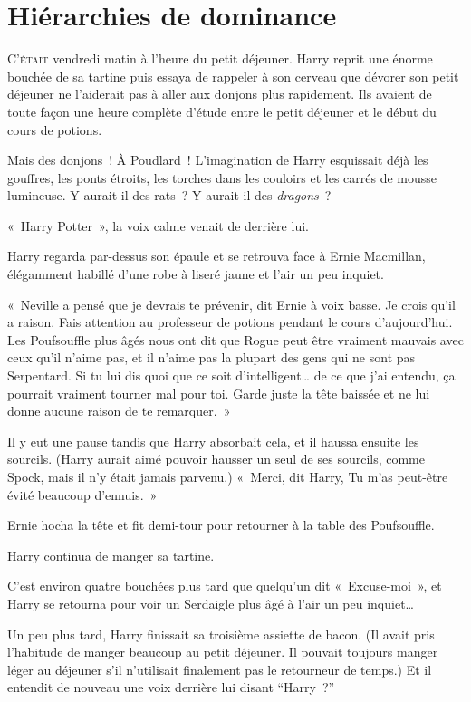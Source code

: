 
\chapter{Hiérarchies de dominance}

\lettrine{C}{'était} vendredi matin à l'heure du petit déjeuner.
Harry reprit une énorme bouchée de sa tartine puis essaya de rappeler à son cerveau que dévorer son petit déjeuner ne l'aiderait pas à aller aux donjons plus rapidement.
Ils avaient de toute façon une heure complète d'étude entre le petit déjeuner et le début du cours de potions.

Mais des donjons~!
À Poudlard~!
L'imagination de Harry esquissait déjà les gouffres, les ponts étroits, les torches dans les couloirs et les carrés de mousse lumineuse.
Y aurait-il des rats~?
Y aurait-il des \emph{dragons}~?

«~Harry Potter~», la voix calme venait de derrière lui.

Harry regarda par-dessus son épaule et se retrouva face à Ernie Macmillan, élégamment habillé d’une robe à liseré jaune et l'air un peu inquiet.

«~Neville a pensé que je devrais te prévenir, dit Ernie à voix basse.
Je crois qu'il a raison.
Fais attention au professeur de potions pendant le cours d'aujourd'hui.
Les Poufsouffle plus âgés nous ont dit que Rogue peut être vraiment mauvais avec ceux qu'il n'aime pas, et il n'aime pas la plupart des gens qui ne sont pas Serpentard.
Si tu lui dis quoi que ce soit d'intelligent… de ce que j'ai entendu, ça pourrait vraiment tourner mal pour toi.
Garde juste la tête baissée et ne lui donne aucune raison de te remarquer.~»

Il y eut une pause tandis que Harry absorbait cela, et il haussa ensuite les sourcils. (Harry aurait aimé pouvoir hausser un seul de ses sourcils, comme Spock, mais il n'y était jamais parvenu.)
«~Merci, dit Harry, Tu m'as peut-être évité beaucoup d'ennuis.~»

Ernie hocha la tête et fit demi-tour pour retourner à la table des Poufsouffle.

Harry continua de manger sa tartine.

C'est environ quatre bouchées plus tard que quelqu'un dit «~Excuse-moi~», et Harry se retourna pour voir un Serdaigle plus âgé à l'air un peu inquiet…

Un peu plus tard, Harry finissait sa troisième assiette de bacon.
(Il avait pris l'habitude de manger beaucoup au petit déjeuner.
Il pouvait toujours manger léger au déjeuner s'il n'utilisait finalement pas le retourneur de temps.)
Et il entendit de nouveau une voix derrière lui disant “Harry~?”

